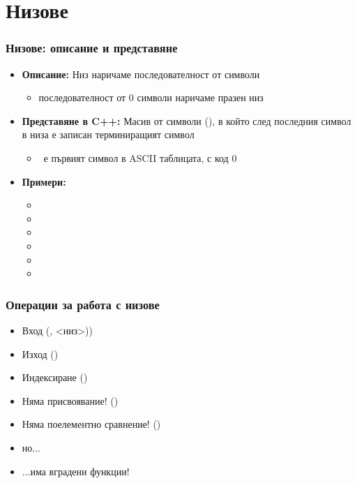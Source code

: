 \documentclass{beamer}
\begin{document}
\section{Низове}

\newcommand{\s}{<низ>\xspace}
\renewcommand{\ss}[1]{<низ$_{#1}$>\xspace}
\renewcommand{\b}{<буфер>\xspace}

\begin{frame}
  \frametitle{Низове: описание и представяне}

  \begin{itemize}[<+->]
  \item \textbf{Описание:} \alert{Низ} наричаме последователност от символи
    \begin{itemize}
    \item последователност от 0 символи наричаме \alert{празен низ}
    \end{itemize}
  \item \textbf{Представяне в C++:} Масив от символи (), в който след последния символ в низа е записан \alert{терминиращият символ} \term
    \begin{itemize}
    \item \term\ е първият символ в ASCII таблицата, с код 0
    \end{itemize}
  \item \textbf{Примери:}
    \begin{itemize}
    \item {}
    \item {}
    \item {}
    \item {}
    \item {}
    \item {}
    \end{itemize}
  \end{itemize}
\end{frame}

\begin{frame}
  \frametitle{Операции за работа с низове}

  \begin{itemize}[<+->]
  \item Вход (\tta{>{}>}, \s\tta))
  \item Изход (\tta{<{}<})
  \item Индексиране (\tta{[]})
  \item Няма присвоявание! ()
  \item Няма поелементно сравнение! ()
  \item но...
  \item ...има вградени функции!
  \end{itemize}
\end{frame}
\end{document}
